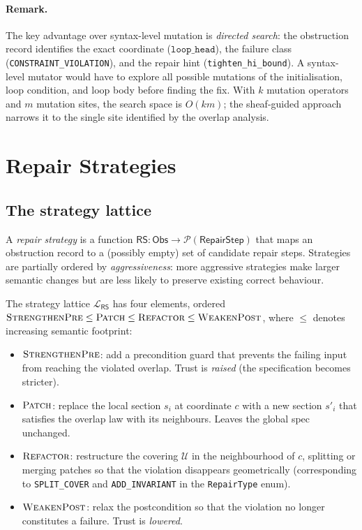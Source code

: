 \documentclass[11pt]{article}
\newcommand{\RS}{\mathsf{RS}}               %
\newcommand{\Patch}{\textsc{Patch}}
\newcommand{\Refactor}{\textsc{Refactor}}
\newcommand{\StrengthenPre}{\textsc{StrengthenPre}}
\newcommand{\WeakenPost}{\textsc{WeakenPost}}
\begin{document}
\paragraph{Remark.}
The key advantage over syntax-level mutation is \emph{directed search}: the
obstruction record identifies the exact coordinate ($\mathtt{loop\_head}$),
the failure class (\texttt{CONSTRAINT\_VIOLATION}), and the repair hint
(\texttt{tighten\_hi\_bound}).  A syntax-level mutator would have to explore
all possible mutations of the initialisation, loop condition, and loop body
before finding the fix.  With $k$ mutation operators and $m$ mutation sites,
the search space is $O(km)$; the sheaf-guided approach narrows it to the
single site identified by the overlap analysis.

\section{Repair Strategies}
\label{sec:strategies}

\subsection{The strategy lattice}

A \emph{repair strategy} is a function
$\RS : \mathsf{Obs} \to \mathcal{P}(\mathsf{RepairStep})$
that maps an obstruction record to a (possibly empty) set of candidate repair
steps.  Strategies are partially ordered by \emph{aggressiveness}: more
aggressive strategies make larger semantic changes but are less likely to
preserve existing correct behaviour.

\begin{definition}[Strategy lattice $\mathcal{L}_\RS$]
\label{def:strategy-lattice}
The strategy lattice $\mathcal{L}_\RS$ has four elements, ordered
$\StrengthenPre \leq \Patch \leq \Refactor \leq \WeakenPost$, where
$\leq$ denotes increasing semantic footprint:
\begin{itemize}[itemsep=2pt]
  \item $\StrengthenPre$: add a precondition guard that prevents the failing
        input from reaching the violated overlap.  Trust is \emph{raised}
        (the specification becomes stricter).
  \item $\Patch$: replace the local section $s_i$ at coordinate $c$ with a
        new section $s'_i$ that satisfies the overlap law with its neighbours.
        Leaves the global spec unchanged.
  \item $\Refactor$: restructure the covering $\mathcal{U}$ in the
        neighbourhood of $c$, splitting or merging patches so that the
        violation disappears geometrically (corresponding to
        \texttt{SPLIT\_COVER} and \texttt{ADD\_INVARIANT} in the
        \texttt{RepairType} enum).
  \item $\WeakenPost$: relax the postcondition so that the violation no
        longer constitutes a failure.  Trust is \emph{lowered}.
\end{itemize}
\end{definition}
\end{document}

